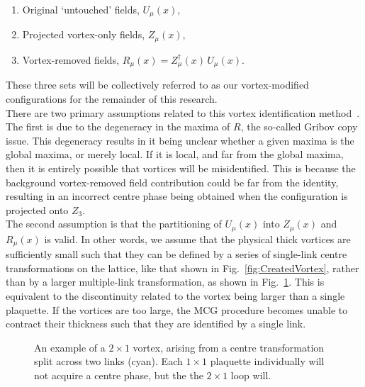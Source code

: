 \begin{enumerate}
\item Original `untouched' fields, $U_{\mu}(x),$

\item Projected vortex-only fields, $Z_{\mu}(x),$

\item Vortex-removed fields, $R_\mu(x) = Z^{\dagger}_{\mu}(x)\,U_{\mu}(x).$
\end{enumerate}
These three sets will be collectively referred to as our vortex-modified configurations for the remainder of this research.\\

There are two primary assumptions related to this vortex identification method~\cite{Faber:1999gu}. The first is due to the degeneracy in the maxima of $R$, the so-called Gribov copy issue. This degeneracy results in it being unclear whether a given maxima is the global maxima, or merely local. If it is local, and far from the global maxima, then it is entirely possible that vortices will be misidentified. This is because the background vortex-removed field contribution could be far from the identity, resulting in an incorrect centre phase being obtained when the configuration is projected onto $Z_3$.\\

The second assumption is that the partitioning of $U_\mu(x)$ into $Z_\mu(x)$ and $R_\mu(x)$ is valid. In other words, we assume that the physical thick vortices are sufficiently small such that they can be defined by a series of single-link centre transformations on the lattice, like that shown in Fig.~\ref{fig:CreatedVortex}, rather than by a larger multiple-link transformation, as shown in Fig.~\ref{fig:MultipleLink}. This is equivalent to the discontinuity related to the vortex being larger than a single plaquette. If the vortices are too large, the MCG procedure becomes unable to contract their thickness such that they are identified by a single link.\\
%
\begin{figure}[htb!]
\centering

\caption[An example of a $2\times 1$ vortex, arising from a centre transformation split across two links.]{\label{fig:MultipleLink} An example of a $2\times 1$ vortex, arising from a centre transformation split across two links (cyan). Each $1\times 1$ plaquette individually will not acquire a centre phase, but the the $2\times 1$ loop will.}
\end{figure}
%

